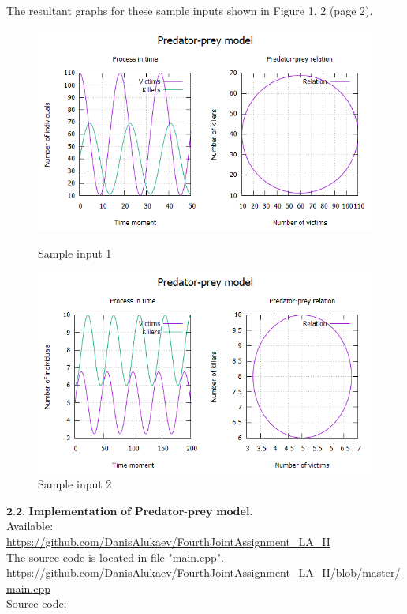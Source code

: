 \documentclass[11pt]{article}
\begin{document}
\noindent The resultant graphs for these sample inputs shown in Figure 1, 2 (page 2).
\begin{figure}
\centering
\includegraphics[width=\textwidth]{Sample1.png}
\caption{Sample input 1}
\label{fig:mpr}
\bigbreak
\centering
\includegraphics[width=\textwidth]{Sample2.png}
\caption{Sample input 2}
\label{fig:mpr}
\end{figure}
\bigbreak
\bigbreak
\bigbreak
\bigbreak
\bigbreak


\noindent $\textbf{2.2. Implementation of Predator-prey model.}$\\
\noindent [Online] Available:\\
\url{https://github.com/DanisAlukaev/FourthJointAssignment_LA_II}\\
The source code is located in file "main.cpp".\\
\url{https://github.com/DanisAlukaev/FourthJointAssignment_LA_II/blob/master/main.cpp}\\
\noindent Source code:
\end{document}
